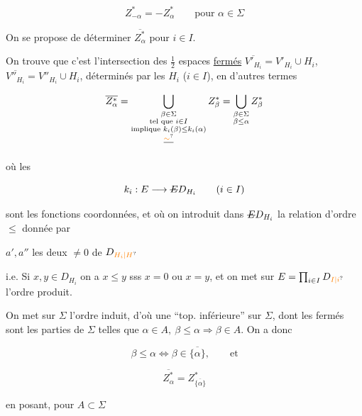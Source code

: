 \[
Z^*_{-\alpha}=-Z^*_\alpha\qquad\text{pour }\alpha\in\Sigma
\]

On se propose de déterminer $\overline{Z^*_\alpha}$ pour $i\in I$.


On trouve que c'est l'intersection des $\tfrac12$ espaces \uline{fermés} $\overline{V'_{H_i}}=V'_{H_i}\cup H_i$, $\overline{V''_{H_i}}=V''_{H_i}\cup H_i$, déterminés par les $H_i$ ($i\in I$),  en d'autres termes

\[
\overline{Z^*_\alpha}=\bigcup_{\substack{\beta\in\Sigma\\\text{tel que }i\in I\\\text{implique }k_i(\beta)\leq k_i(\alpha)\\\deleted{\unsure{\sim}}}}Z^*_\beta
=\bigcup_{\substack{\beta\in\Sigma\\\beta\leq\alpha}}Z^*_\beta
\]

où les 

\[
k_i:E\longrightarrow\deleted{E}D_{H_i}\qquad(i\in I)
\]

sont les fonctions coordonnées, et où on introduit dans $\deleted{E}D_{H_i}$ la relation d'ordre $\leq$ donnée par


$a',a''$ les deux  $\ne 0$ de $D_{\unsure{H_i|H}}$

i.e. Si $x,y\in D_{H_i}$ on a $x\leq y$ sss $x=0$ ou $x=y$, et on met sur $E=\prod_{i\in I}D_{\unsure{I|i}}$ l'ordre produit.

On  met sur $\Sigma$ l'ordre induit, d'où une ``top. inférieure'' sur $\Sigma$, dont les fermés sont les parties  de $\Sigma$ telles que $\alpha\in A,\ \beta\leq\alpha\Rightarrow\beta\in A$. On a donc

\[
\beta\leq\alpha\iff\beta\in\overline{\{\alpha\}},\qquad\text{et}
\]

\[
\overline{Z^*_\alpha}=Z^*_{\overline{\{\alpha\}}}
\]

en posant, pour $A\subset\Sigma$

